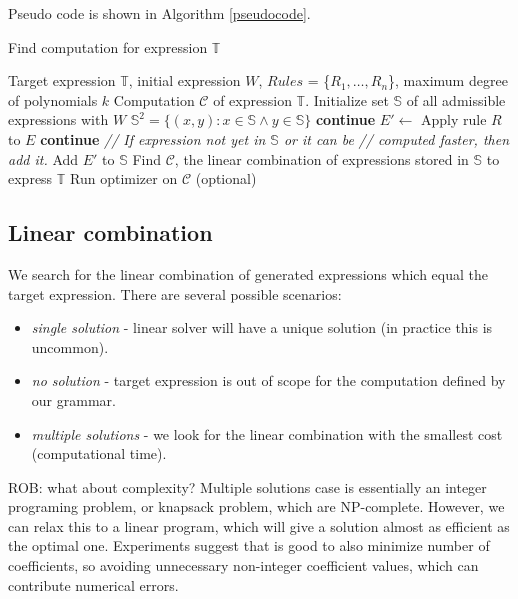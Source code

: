 Pseudo code is shown in Algorithm \ref{pseudocode}.

\begin{algorithm}[t]
\caption{Find computation for expression $\mathbb{T}$}
\begin{algorithmic} 
\REQUIRE Target expression $\mathbb{T}$, initial expression $W$, $Rules$ = \{$R_1, \dots, R_n$\}, maximum degree of polynomials $k$
\ENSURE Computation $\mathcal{C}$ of expression $\mathbb{T}$.
\STATE Initialize set $\mathbb{S}$ of all admissible expressions with $W$
\STATE $\mathbb{S}^2 = \{ (x, y) : x \in \mathbb{S} \land y \in \mathbb{S}\}$ 
\STATE \textbf{continue}
\ENDIF
\STATE $E' \gets$ Apply rule $R$ to $E$
  \STATE \textbf{continue}
\ENDIF
\STATE \emph{// If expression not yet in $\mathbb{S}$ or it can be}
\STATE \emph{// computed faster, then add it.}
  \STATE Add $E'$ to $\mathbb{S}$
\ENDIF
\ENDFOR
\ENDFOR
\ENDWHILE
\STATE Find $\mathcal{C}$, the linear combination of expressions stored in $\mathbb{S}$ to express $\mathbb{T}$
\STATE Run optimizer on $\mathcal{C}$ (optional)
\end{algorithmic}
\label{pseudocode}
\end{algorithm}


\subsection{Linear combination}
\label{sec:linear}

We search for the linear combination of generated expressions which equal the target expression. 
There are several possible scenarios:
\begin{itemize}
  \item \emph{single solution} - linear solver will have a unique solution (in practice
 this is uncommon).
 \item \emph{no solution} - target expression is out of scope for the computation defined by
our grammar. 
 \item  \emph{multiple solutions} - we look for the linear combination with the smallest cost
(computational time). 
\end{itemize}
ROB: what about complexity?
Multiple solutions case is essentially an integer programing
problem, or knapsack problem, which are NP-complete. However, we can
relax this to a linear program, which will give a solution almost as
efficient as the optimal one. Experiments suggest that is good to
also minimize number of coefficients, so avoiding unnecessary
non-integer coefficient values, which can contribute numerical errors.


